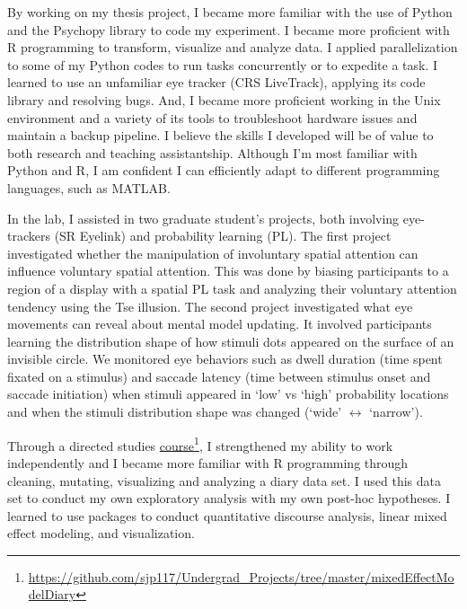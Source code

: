 \documentclass[12pt]{article}
\begin{document}
	By working on my thesis project, I became more familiar with the use of Python and the Psychopy library to code my experiment. I became more proficient with R programming to transform, visualize and analyze data. I applied parallelization to some of my Python codes to run tasks concurrently or to expedite a task. I learned to use an unfamiliar eye tracker (CRS LiveTrack), applying its code library and resolving bugs. And, I became more proficient working in the Unix environment and a variety of its tools to troubleshoot hardware issues and maintain a backup pipeline. I believe the skills I developed will be of value to both research and teaching assistantship. Although I’m most familiar with Python and R, I am confident I can efficiently adapt to different programming languages, such as MATLAB.

	In the lab, I assisted in two graduate student's projects, both involving eye-trackers (SR Eyelink) and probability learning (PL). The first project investigated whether the manipulation of involuntary spatial attention can influence voluntary spatial attention. This was done by biasing participants to a region of a display with a spatial PL task and analyzing their voluntary attention tendency using the Tse illusion. The second project investigated what eye movements can reveal about mental model updating. It involved participants learning the distribution shape of how stimuli dots appeared on the surface of an invisible circle. We monitored eye behaviors such as dwell duration (time spent fixated on a stimulus) and saccade latency (time between stimulus onset and saccade initiation) when stimuli appeared in `low' vs `high' probability locations and when the stimuli distribution shape was changed (`wide' $\leftrightarrow$ `narrow').

	Through a directed studies \href{https://github.com/sjp117/Undergrad_Projects/tree/master/mixedEffectModelDiary}{course}\footnote{\url{https://github.com/sjp117/Undergrad\_Projects/tree/master/mixedEffectModelDiary}}, I strengthened my ability to work independently and I became more familiar with R programming through cleaning, mutating, visualizing and analyzing a diary data set. I used this data set to conduct my own exploratory analysis with my own post-hoc hypotheses. I learned to use packages to conduct quantitative discourse analysis, linear mixed effect modeling, and visualization.
	
\end{document}
